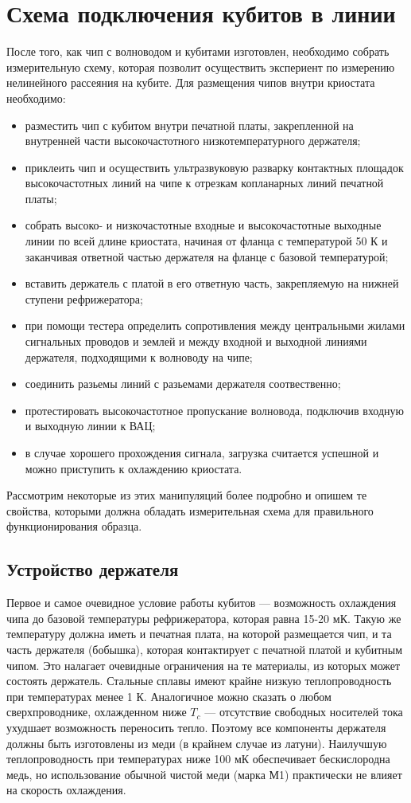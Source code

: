 \section{Схема подключения кубитов в линии}
После того, как чип с волноводом и кубитами изготовлен, необходимо  собрать измерительную схему, которая позволит осуществить экспериент по измерению нелинейного рассеяния на кубите. Для размещения чипов внутри криостата необходимо:
\begin{itemize}
	\item{разместить чип с кубитом внутри печатной платы, закрепленной на внутренней части высокочастотного низкотемпературного держателя;}
	\item{приклеить чип и осуществить ультразвуковую разварку контактных площадок высокочастотных линий на чипе к отрезкам копланарных линий печатной платы;}
	\item{собрать высоко- и низкочастотные входные и высокочастотные выходные линии по всей длине криостата, начиная от фланца с температурой 50 К и заканчивая ответной частью держателя на фланце с базовой температурой;}
	\item{вставить держатель с платой в его ответную часть, закрепляемую на нижней ступени рефрижератора;}
	\item{при помощи тестера определить сопротивления между центральными жилами сигнальных проводов и землей и между входной и выходной линиями держателя, подходящими к волноводу на чипе;}
	\item{соединить разьемы линий с разьемами держателя соотвественно;}
	\item{протестировать высокочастотное пропускание волновода, подключив входную и выходную линии к ВАЦ;}
	\item{в случае хорошего прохождения сигнала, загрузка считается успешной и можно приступить к охлаждению криостата.}
\end{itemize} 
Рассмотрим некоторые из этих манипуляций более подробно и опишем те свойства, которыми должна обладать измерительная схема для правильного функционирования образца. 
\subsection{Устройство держателя}

Первое и самое очевидное условие работы кубитов --- возможность охлаждения чипа до базовой температуры рефрижератора, которая равна 15-20 мК. Такую же температуру должна иметь и печатная плата, на которой размещается чип, и та часть держателя (бобышка), которая контактирует с печатной платой и кубитным чипом. Это налагает очевидные ограничения на те материалы, из которых может состоять держатель. Стальные сплавы имеют крайне низкую теплопроводность при температурах менее 1 К. Аналогичное можно сказать о любом сверхпроводнике, охлажденном ниже $T_c$ --- отсутствие свободных носителей тока ухудшает возможность переносить тепло. Поэтому все компоненты держателя должны быть изготовлены из меди (в крайнем случае из латуни). Наилучшую теплопроводность при температурах ниже 100 мК обеспечивает бескислородна медь, но использование обычной чистой меди (марка М1) практически не влияет на скорость охлаждения. 

